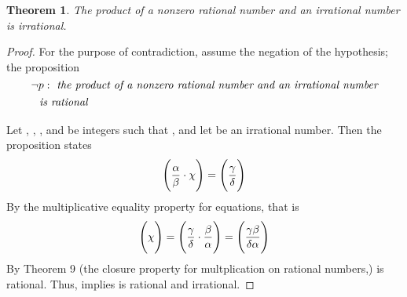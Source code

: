 \documentclass[preview]{standalone}
\newtheorem{theorem}{Theorem}
\begin{document}
\begin{theorem} %
    The product of a nonzero rational number and an irrational number is 
    irrational.
\end{theorem}

\begin{proof}
    For the purpose of contradiction, assume the negation of the hypothesis; 
    the proposition 
        $$\lnot p : \emph{ the product of a nonzero rational number and an 
        irrational number}$$
        $\indent \indent \emph{is rational}$
        \\ \\
    Let \bm{$\alpha$}, \bm{$\beta$}, \bm{$\gamma$}, and \bm{$\delta$} be integers such that 
    , and let \bm{$\chi$} be an irrational number. 
    Then the proposition  states 
    \begin{equation*}
        \Bigg(
            \frac{\alpha}{\beta} \space \cdot \space \chi 
        \Bigg)
            = 
        \Bigg(
            \frac{\gamma}{\delta}
        \Bigg)
    \end{equation*}    
    By the multiplicative equality property for equations, that is
    \begin{equation*}
        \Bigg(
            \chi
        \Bigg) 
            = 
        \Bigg(
            \frac{\gamma}{\delta} \space \cdot \space \frac{\beta}{\alpha} 
        \Bigg)
            =
        \Bigg( 
            \frac{\gamma\beta}{\delta\alpha}
        \Bigg)
    \end{equation*}
    By Theorem 9 (the closure property for multplication on rational numbers,) 
    \bm{$\chi$} is rational. 
    Thus,  implies \bm{$\chi$} is rational and irrational.
\end{proof}
\end{document}
